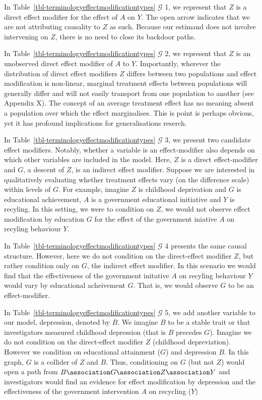 \documentclass[
  single column]{article}
\begin{document}
In Table~\ref{tbl-terminologyeffectmodificationtypes} \(\mathcal{G}\) 1,
we represent that \(Z\) is a direct effect modifier for the effect of
\(A\) on \(Y\). The open arrow indicates that we are not attributing
causality to \(Z\) as such. Because our estimand does not involve
intervening on \(Z\), there is no need to close its backdoor paths.

In Table~\ref{tbl-terminologyeffectmodificationtypes} \(\mathcal{G}\) 2,
we represent that \(Z\) is an unobserved direct effect modifier of \(A\)
to \(Y\). Importantly, wherever the distribution of direct effect
modifiers \(Z\) differs between two populations and effect modification
is non-linear, marginal treatment effects between populations will
generally differ and will not easily transport from one population to
another (see Appendix X). The concept of an average treatment effect has
no meaning absent a population over which the effect marginalises. This
is point is perhaps obvious, yet it has profound implications for
generalisations reserch.

In Table~\ref{tbl-terminologyeffectmodificationtypes} \(\mathcal{G}\) 3,
we present two candidate effect modifiers. Notably, whether a variable
is an effect-modifier also depends on which other variables are included
in the model. Here, \(Z\) is a direct effect-modifier and \(G\), a
descent of \(Z\), is an indirect effect modifier. Suppose we are
interested in qualitatively evaluating whether treatment effects vary
(on the difference scale) within levels of \(G\). For example, imagine
\(Z\) is childhood deprivation and \(G\) is educational achievement,
\(A\) is a government educational initiative and \(Y\) is recyling. In
this setting, we were to condition on \(Z\), we would not observe effect
modification by education \(G\) for the effect of the government
iniative \(A\) on recyling behaviour \(Y\).

In Table~\ref{tbl-terminologyeffectmodificationtypes} \(\mathcal{G}\) 4
presents the same causal structure. However, here we do not condition on
the direct-effect modifier \(Z\), but rather condition only on \(G\),
the indirect effect modifier. In this scenario we would find that the
effectiveness of the government initative \(A\) on recyling behaviour
\(Y\) would vary by educational acheivement \(G\). That is, we would
observe \(G\) to be an effect-modifier.

In Table~\ref{tbl-terminologyeffectmodificationtypes} \(\mathcal{G}\) 5,
we add another variable to our model, depression, denoted by \(B\). We
imagine \(B\) to be a stable trait or that investigators measured
childhood depression (that is \(B\) precedes \(G\)). Imagine we do not
condition on the direct-effect modifier \(Z\) (childhood depreviation).
However we condition on educational attainment (\(G\)) and depression
\(B\). In this graph, \(G\) is a collider of \(Z\) and \(B\). Thus,
conditioning on \(G\) (but not \(Z\)) would open a path from
\(B \association G \association Z  \association Y\) and investigators
would find an evidence for effect modification by depression and the
effectiveness of the government intervention \(A\) on recycling (\(Y\))
\end{document}
